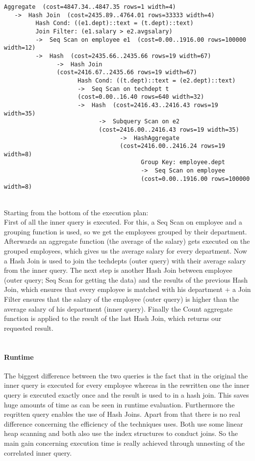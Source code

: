 \documentclass[11pt]{scrartcl}
\begin{document}
\begin{verbatim}
Aggregate  (cost=4847.34..4847.35 rows=1 width=4)
   ->  Hash Join  (cost=2435.89..4764.01 rows=33333 width=4)
         Hash Cond: ((e1.dept)::text = (t.dept)::text)
         Join Filter: (e1.salary > e2.avgsalary)
         ->  Seq Scan on employee e1  (cost=0.00..1916.00 rows=100000 width=12)
         ->  Hash  (cost=2435.66..2435.66 rows=19 width=67)
               ->  Hash Join
               (cost=2416.67..2435.66 rows=19 width=67)
                     Hash Cond: ((t.dept)::text = (e2.dept)::text)
                     ->  Seq Scan on techdept t
                     (cost=0.00..16.40 rows=640 width=32)
                     ->  Hash  (cost=2416.43..2416.43 rows=19 width=35)
                           ->  Subquery Scan on e2
                           (cost=2416.00..2416.43 rows=19 width=35)
                                 ->  HashAggregate
                                 (cost=2416.00..2416.24 rows=19 width=8)
                                       Group Key: employee.dept
                                       ->  Seq Scan on employee
                                       (cost=0.00..1916.00 rows=100000 width=8)
\end{verbatim}
\ \\
Starting from the bottom of the execution plan:\\
First of all the inner query is executed. For this, a Seq Scan on employee and a grouping function is used, so we get the employees grouped by their department. Afterwards an aggregate function (the average of the salary) gets executed on the grouped employees, which gives us the average salary for every department. Now a Hash Join is used to join the techdepts (outer query) with their average salary from the inner query. The next step is another Hash Join between employee (outer query; Seq Scan for getting the data) and the results of the previous Hash Join, which ensures that every employee is matched with his department + a Join Filter ensures that the salary of the employee (outer query) is higher than the average salary of his department (inner query). Finally the Count aggregate function is applied to the result of the last Hash Join, which returns our requested result.
\\ \\
\paragraph{Runtime}
The biggest difference between the two queries is the fact that in the original the inner query is executed for every employee whereas in the rewritten one the inner query is executed exactly once and the result is used to in a hash join. This saves huge amounts of time as can be seen in runtime evaluation. Furthermore the reqritten query enables the use of Hash Joins. Apart from that there is no real difference concerning the efficiency of the techniques uses. Both use some linear heap scanning and both also use the index structures to conduct joins. So the main gain concerning execution time is really achieved through unnesting of the correlated inner query.
\end{document}
